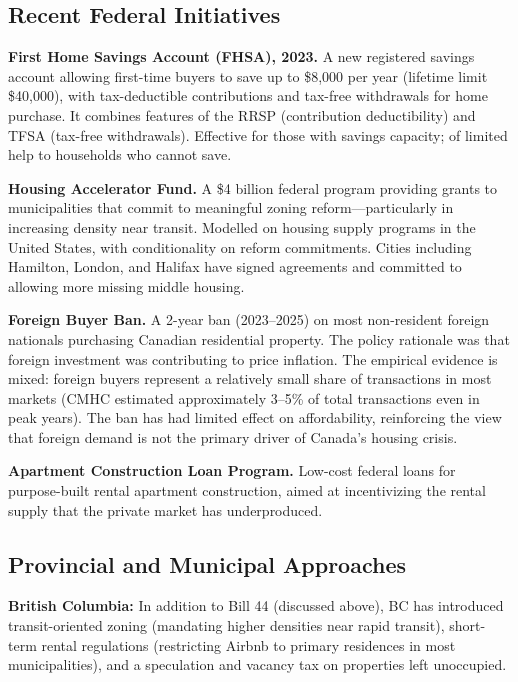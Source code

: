 \subsection{Recent Federal Initiatives}

\textbf{First Home Savings Account (FHSA), 2023.} A new registered savings account allowing first-time buyers to save up to \$8,000 per year (lifetime limit \$40,000), with tax-deductible contributions and tax-free withdrawals for home purchase. It combines features of the RRSP (contribution deductibility) and TFSA (tax-free withdrawals). Effective for those with savings capacity; of limited help to households who cannot save.

\textbf{Housing Accelerator Fund.} A \$4 billion federal program providing grants to municipalities that commit to meaningful zoning reform---particularly in increasing density near transit. Modelled on housing supply programs in the United States, with conditionality on reform commitments. Cities including Hamilton, London, and Halifax have signed agreements and committed to allowing more missing middle housing.

\textbf{Foreign Buyer Ban.} A 2-year ban (2023--2025) on most non-resident foreign nationals purchasing Canadian residential property. The policy rationale was that foreign investment was contributing to price inflation. The empirical evidence is mixed: foreign buyers represent a relatively small share of transactions in most markets (CMHC estimated approximately 3--5\% of total transactions even in peak years). The ban has had limited effect on affordability, reinforcing the view that foreign demand is not the primary driver of Canada's housing crisis.

\textbf{Apartment Construction Loan Program.} Low-cost federal loans for purpose-built rental apartment construction, aimed at incentivizing the rental supply that the private market has underproduced.

\subsection{Provincial and Municipal Approaches}

\textbf{British Columbia:} In addition to Bill 44 (discussed above), BC has introduced transit-oriented zoning (mandating higher densities near rapid transit), short-term rental regulations (restricting Airbnb to primary residences in most municipalities), and a speculation and vacancy tax on properties left unoccupied.

